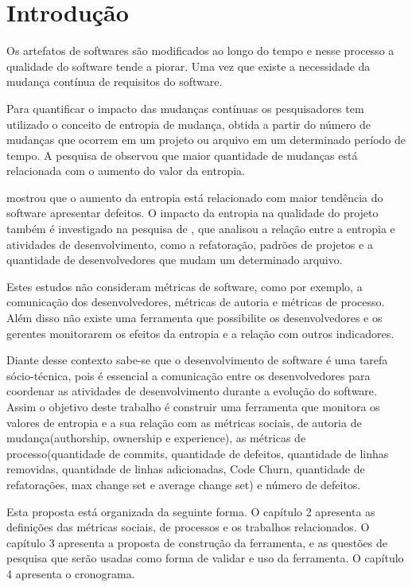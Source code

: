 \chapter{Introdução}

Os artefatos de softwares são modificados ao longo do tempo e nesse processo a qualidade do software tende a piorar\cite{Hassan:2009:PFU:1555001.1555024}. Uma vez que existe a necessidade da mudança contínua de requisitos do software.

Para quantificar o impacto das mudanças contínuas os pesquisadores\cite{Hassan:2009:PFU:1555001.1555024}  tem utilizado o conceito de entropia de mudança, obtida a partir do número de mudanças que ocorrem em um projeto ou arquivo em um determinado período de tempo. A pesquisa de  observou que maior quantidade de mudanças está relacionada com o aumento do valor da entropia.

 mostrou que o aumento da entropia está relacionado com maior tendência do software apresentar defeitos. O impacto da entropia na qualidade do projeto também é investigado na pesquisa de , que analisou a relação entre a entropia e atividades de desenvolvimento, como a refatoração, padrões de projetos e a quantidade de desenvolvedores que mudam um determinado arquivo.

Estes estudos não consideram métricas de software, como por exemplo, a comunicação dos desenvolvedores, métricas de autoria e métricas de processo. Além disso não existe uma ferramenta que possibilite os desenvolvedores e os gerentes monitorarem os efeitos da entropia e a relação com outros indicadores.

Diante desse contexto sabe-se que o desenvolvimento de software é uma tarefa sócio-técnica, pois é essencial a comunicação entre os desenvolvedores para coordenar as atividades de desenvolvimento durante a evolução do software. Assim o objetivo deste trabalho é construir uma ferramenta que monitora os valores de entropia e a sua relação com as métricas sociais, de autoria de mudança(authorship, ownership e experience), as métricas de processo(quantidade de commits, quantidade de defeitos, quantidade de linhas removidas, quantidade de linhas adicionadas, Code Churn, quantidade de refatorações, max change set e average change set) e número de defeitos.

Esta proposta está organizada da seguinte forma. O capítulo 2 apresenta as definições das métricas sociais, de processos e os trabalhos relacionados. O capítulo 3 apresenta a proposta de construção da ferramenta, e as questões de pesquisa que serão usadas como forma de validar e uso da ferramenta. O capítulo 4 apresenta o cronograma.